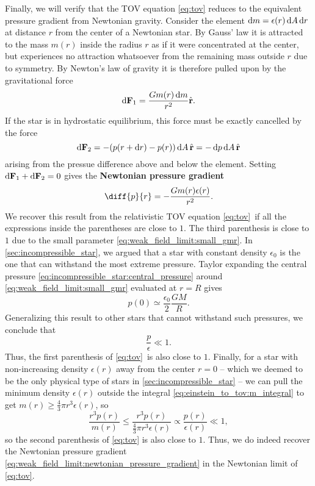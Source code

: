Finally, we will verify that the TOV equation \eqref{eq:tov} reduces to the equivalent pressure gradient from Newtonian gravity.
Consider the element $\mathop{}\!\mathrm{d} m = \epsilon(r) \mathop{}\!\mathrm{d} A \mathop{}\!\mathrm{d} r$ at distance $r$ from the center of a Newtonian star.
By Gauss' law it is attracted to the mass $m(r)$ inside the radius $r$ as if it were concentrated at the center, but experiences no attraction whatsoever from the remaining mass outside $r$ due to symmetry.
By Newton's law of gravity it is therefore pulled upon by the gravitational force
\begin{equation}
	\mathop{}\!\mathrm{d} \mathbf{F}_1 = \frac{G m(r) \mathop{}\!\mathrm{d} m}{r^2} \hat{\textbf{r}} .
	\label{eq:weak_field_limit:force_newton}
\end{equation}
If the star is in hydrostatic equilibrium, this force must be exactly cancelled by the force
\begin{equation}
	\mathop{}\!\mathrm{d} \textbf{F}_2 = -(p(r + \mathop{}\!\mathrm{d} r) - p(r)) \mathop{}\!\mathrm{d} A \, \hat{\textbf{r}} = -\mathop{}\!\mathrm{d} p \mathop{}\!\mathrm{d} A \, \hat{\textbf{r}}
	\label{eq:weak_field_limit:force_pressure}
\end{equation}
arising from the pressue difference above and below the element.
Setting $\mathop{}\!\mathrm{d} \textbf{F}_1 + \mathop{}\!\mathrm{d} \textbf{F}_2 = 0$ gives the \textbf{Newtonian pressure gradient}
\begin{equation}
	\diff{p}{r} = -\frac{G m(r) \epsilon(r)}{r^2} .
	\label{eq:weak_field_limit:newtonian_pressure_gradient}
\end{equation}
We recover this result from the relativistic TOV equation \eqref{eq:tov} if all the expressions inside the parentheses are close to $1$.
The third parenthesis is close to $1$ due to the small parameter \eqref{eq:weak_field_limit:small_gmr}.
In \cref{sec:incompressible_star}, we argued that a star with constant density $\epsilon_0$ is the one that can withstand the most extreme pressure.
Taylor expanding the central pressure \eqref{eq:incompressible_star:central_pressure} around \eqref{eq:weak_field_limit:small_gmr} evaluated at $r=R$ gives
\begin{equation}
	p(0) \simeq \frac{\epsilon_0}{2} \frac{G M}{R}.
\end{equation}
Generalizing this result to other stars that cannot withstand such pressures, we conclude that
\begin{equation}
	\frac{p}{\epsilon} \ll 1 .
\end{equation}
Thus, the first parenthesis of \cref{eq:tov} is also close to $1$.
Finally, for a star with non-increasing density $\epsilon(r)$ away from the center $r=0$ -- which we deemed to be the only physical type of stars in \cref{sec:incompressible_star} -- we can pull the minimum density $\epsilon(r)$ outside the integral \eqref{eq:einstein_to_tov:m_integral} to get $m(r) \geq \frac{4}{3} \pi r^3 \epsilon(r)$, so
\begin{equation*}
	\frac{r^3 p(r)}{m(r)} \leq    \frac{r^3 p(r)}{\frac{4}{3} \pi r^3 \epsilon(r)}
	                      \propto \frac{p(r)}{\epsilon(r)}
						  \ll  1 ,
\end{equation*}
so the second parenthesis of \cref{eq:tov} is also close to $1$.
Thus, we do indeed recover the Newtonian pressure gradient \eqref{eq:weak_field_limit:newtonian_pressure_gradient} in the Newtonian limit of \cref{eq:tov}.
